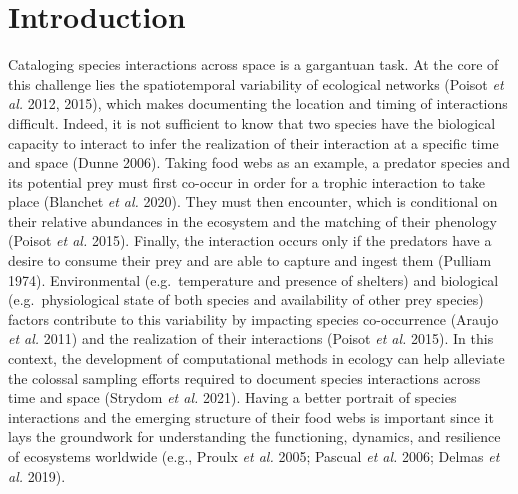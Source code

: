 \documentclass[11pt]{article}
\begin{document}
\vfill

\clearpage
\linenumbers
\pagestyle{normal}

\hypertarget{introduction}{%
\section{Introduction}\label{introduction}}

Cataloging species interactions across space is a gargantuan task. At
the core of this challenge lies the spatiotemporal variability of
ecological networks (Poisot \emph{et al.} 2012, 2015), which makes
documenting the location and timing of interactions difficult. Indeed,
it is not sufficient to know that two species have the biological
capacity to interact to infer the realization of their interaction at a
specific time and space (Dunne 2006). Taking food webs as an example, a
predator species and its potential prey must first co-occur in order for
a trophic interaction to take place (Blanchet \emph{et al.} 2020). They
must then encounter, which is conditional on their relative abundances
in the ecosystem and the matching of their phenology (Poisot \emph{et
al.} 2015). Finally, the interaction occurs only if the predators have a
desire to consume their prey and are able to capture and ingest them
(Pulliam 1974). Environmental (e.g.~temperature and presence of
shelters) and biological (e.g.~physiological state of both species and
availability of other prey species) factors contribute to this
variability by impacting species co-occurrence (Araujo \emph{et al.}
2011) and the realization of their interactions (Poisot \emph{et al.}
2015). In this context, the development of computational methods in
ecology can help alleviate the colossal sampling efforts required to
document species interactions across time and space (Strydom \emph{et
al.} 2021). Having a better portrait of species interactions and the
emerging structure of their food webs is important since it lays the
groundwork for understanding the functioning, dynamics, and resilience
of ecosystems worldwide (e.g., Proulx \emph{et al.} 2005; Pascual
\emph{et al.} 2006; Delmas \emph{et al.} 2019).
\end{document}
